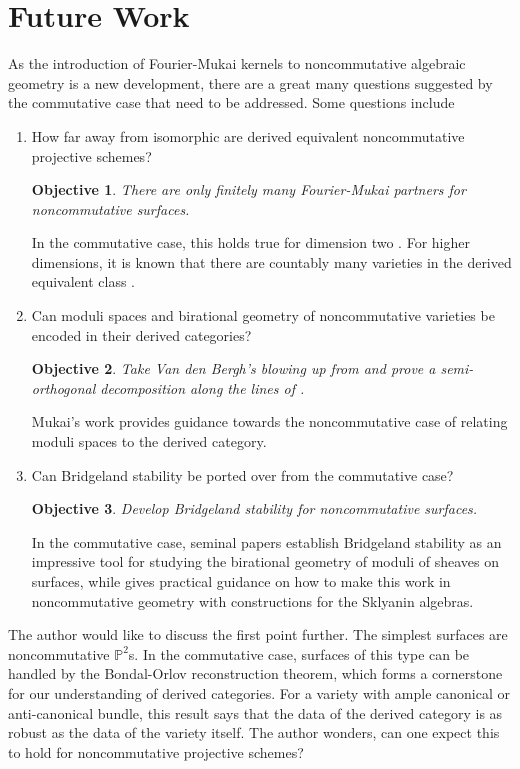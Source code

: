\documentclass[12pt]{amsart}
\newtheorem{objective}{Objective}
\theoremstyle{definition}
\begin{document}
\section*{Future Work}

As the introduction of Fourier-Mukai kernels to noncommutative algebraic geometry is a new development, there are a great many questions suggested by the commutative case that need to be addressed.
Some questions include
\begin{enumerate}
\item
  How far away from isomorphic are derived equivalent noncommutative projective schemes?
  \begin{tcolorbox}
    \begin{objective}
      There are only finitely many Fourier-Mukai partners for noncommutative surfaces.
    \end{objective}
  \end{tcolorbox}
  In the commutative case, this holds true for dimension two \cite[Sect. 12]{HuyFMT}.
  For higher dimensions, it is known that there are countably many varieties in the derived equivalent class \cite{AnToe}.
\item
  Can moduli spaces and birational geometry of noncommutative varieties be encoded in their derived categories?
  \begin{tcolorbox}
    \begin{objective}
      Take Van den Bergh's blowing up from \cite{van2001blowing} and prove a semi-orthogonal decomposition along the lines of \cite{Bondal-Orlov}.
    \end{objective}
  \end{tcolorbox}
  \noindent Mukai's work \cite{Mukai81,Mukai87} provides guidance towards the noncommutative case of relating moduli spaces to the derived category.
\item
  Can Bridgeland stability be ported over from the commutative case?
  \begin{tcolorbox}
    \begin{objective}
      Develop Bridgeland stability for noncommutative surfaces.
    \end{objective}
  \end{tcolorbox}
  \noindent In the commutative case, seminal papers \cite{Bri07, ABCH13, BM14a, BM14b} establish Bridgeland stability as an impressive tool for studying the birational geometry of moduli of sheaves on surfaces, while \cite{LiZhMMP} gives practical guidance on how to make this work in noncommutative geometry with constructions for the Sklyanin algebras.
\end{enumerate}
The author would like to discuss the first point further.
The simplest surfaces are noncommutative $\mathbb{P}^2$s.
In the commutative case, surfaces of this type can be handled by the Bondal-Orlov reconstruction theorem, which forms a cornerstone for our understanding of derived categories.
For a variety with ample canonical or anti-canonical bundle, this result says that the data of the derived category is as robust as the data of the variety itself.
The author wonders, can one expect this to hold for noncommutative projective schemes?
\end{document}
